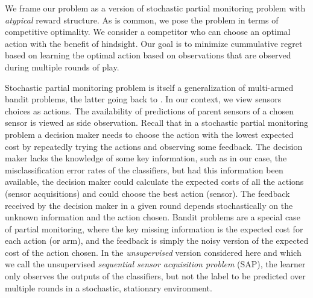 

We frame our problem as a version of stochastic partial monitoring problem \cite{BaFoPaRaSze14} with \emph{atypical} reward structure. As is common, we pose the problem in terms of competitive optimality. We consider a competitor who can choose an optimal action with the benefit of hindsight. Our goal is to minimize cummulative regret based on learning the optimal action based on observations that are observed during multiple rounds of play.


Stochastic partial monitoring problem is itself a generalization of multi-armed bandit problems, the latter going back to \cite{Tho33}. In our context, we view sensors choices as actions. The availability of predictions of parent sensors of a chosen sensor is viewed as side observation.  Recall that in a stochastic partial monitoring problem a decision maker needs to choose the action with the lowest expected cost by repeatedly trying the actions and observing some feedback.
The decision maker lacks the knowledge of some key information, such as in our case, the misclassification
error rates of the classifiers, but had this information been available, the decision maker could calculate the
expected costs of all the actions (sensor acquisitions) and could choose the best action (sensor). The feedback received by the decision maker in a given round depends stochastically on the unknown information and the action chosen.
Bandit problems are a special case of partial monitoring, where the key missing information is the expected
cost for each action (or arm), and the feedback is simply the noisy version of the expected cost of the action chosen.
In the \emph{unsupervised} version considered here
and which we call the unsupervised \emph{sequential sensor acquisition problem} (SAP),
the learner only observes the outputs of the classifiers, but not the label to be predicted over multiple rounds
in a stochastic, stationary environment. 


